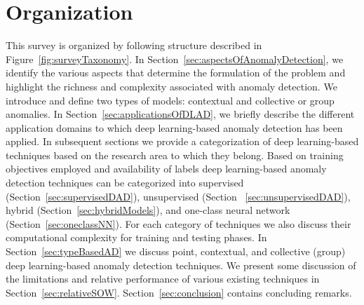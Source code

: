 \section{Organization}
This survey is organized by following structure described in Figure~\ref{fig:surveyTaxonomy}.
In Section~\ref{sec:aspectsOfAnomalyDetection}, we identify the various aspects that determine the formulation of the problem and highlight the richness and complexity associated with anomaly detection.
We introduce and define two types of models: contextual and collective or group anomalies. In Section~\ref{sec:applicationsOfDLAD}, we briefly describe the different application domains to which deep learning-based anomaly detection has been applied. In subsequent sections we provide a categorization of deep learning-based techniques based on the research area to which they belong.  Based on training objectives employed and availability of labels  deep learning-based anomaly detection techniques  can be categorized into supervised (Section~\ref{sec:supervisedDAD}), unsupervised (Section ~\ref{sec:unsupervisedDAD}), hybrid (Section~\ref{sec:hybridModels}), and one-class neural network  (Section~\ref{sec:oneclassNN}). For each category of techniques we also discuss their computational complexity for training and testing phases. In Section~\ref{sec:typeBasedAD} we discuss  point, contextual, and collective (group) deep learning-based anomaly detection techniques. We present some discussion of the limitations and relative performance of various existing techniques in Section~\ref{sec:relativeSOW}. Section~\ref{sec:conclusion} contains
concluding remarks.






